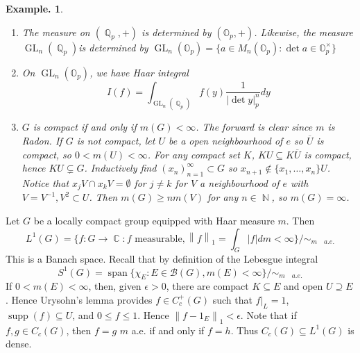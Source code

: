 \documentclass[11pt, a4paper]{memoir}
\DeclareMathOperator{\N}{{\mathbb{N}}}
\DeclareMathOperator{\Q}{{\mathbb{Q}}}
\DeclareMathOperator{\R}{{\mathbb{R}}}
\DeclareMathOperator{\C}{{\mathbb{C}}}
\newcommand{\norm}[1]{\ensuremath{\left\lVert#1\right\rVert}}
\theoremstyle{change}
\theoremstyle{plain}
\theoremstyle{nonumberplain}
\newtheorem{example}{Example.}
\DeclareMathOperator{\GL}{GL}
\DeclareMathOperator{\spn}{span}
\DeclareMathOperator{\supp}{supp}
\numberwithin{equation}{section}
\begin{document}
\begin{example}
\begin{enumerate}[nl,r]
\begin{enumerate}[nl,a]
                    Thus, a closed non-open subgroup $H$ of $G$ is always $m$-locally null.
                    Hence, if $G$ is $\sigma$-compact, then closed non-open $H$ are $m$-null.
                    However, if $G=\R\times\R_d$, $H=\{0\}\times\R_d$ is closed, $m$-locally null, but not $m$-null.
            \end{enumerate}
        \item The measure on $(\Q_p,+)$ is determined by $(\mathbb{O}_p,+)$.
            Likewise, the measure $\GL_n(\Q_p)$is determined by $\GL_n(\mathbb{O}_p)=\{a\in M_n(\mathbb{O}_p):\det a\in\mathbb{O}_p^\times\}$
        \item On $\GL_n(\mathbb{O}_p)$, we have Haar integral
            \begin{equation*}
                I(f)=\int_{\GL_n(\Q_p)}f(y)\frac{1}{|\det y|_p^n}dy
            \end{equation*}
        \item $G$ is compact if and only if $m(G)<\infty$.
            The forward is clear since $m$ is Radon.
            If $G$ is not compact, let $U$ be a open neighbourhood of $e$ so $\overline{U}$ is compact, so $0<m(U)<\infty$.
            For any compact set $K$, $KU\subseteq K\overline{U}$ is compact, hence $KU\subsetneq G$.
            Inductively find $(x_n)_{n=1}^\infty\subset G$ so $x_{n+1}\notin\{x_1,\ldots,x_n\}U$.
            Notice that $x_jV\cap x_kV=\emptyset$ for $j\neq k$ for $V$ a neighbourhood of $e$ with $V=V^{-1},V^2\subset U$.
            Then $m(G)\geq nm(V)$ for any $n\in\N$, so $m(G)=\infty$.
    \end{enumerate}
\end{example}
Let $G$ be a locally compact group equipped with Haar measure $m$.
Then
\begin{equation*}
    L^1(G)=\{f:G\to\C:f\text{ measurable},\norm{f}_1=\int_G|f|dm<\infty\}/\sim_{m\quad a.e.}
\end{equation*}
This is a Banach space.
Recall that by definition of the Lebesgue integral
\begin{equation*}
    S^1(G)=\spn\{\chi_E:E\in\mathcal{B}(G),m(E)<\infty\}/\sim_{m\quad a.e.}
\end{equation*}
If $0<m(E)<\infty$, then, given $\epsilon>0$, there are compact $K\subseteq E$ and open $U\supseteq E$.
Hence Urysohn's lemma provides $f\in C_c^+(G)$ such that $f|_L=1$, $\supp(f)\subseteq U$, and $0\leq f\leq 1$.
Hence $\norm{f-1_E}_1<\epsilon$.
Note that if $f,g\in C_c(G)$, then $f=g$ $m$ a.e. if and only if $f=h$.
Thus $C_c(G)\subseteq L^1(G)$ is dense.
\end{document}
